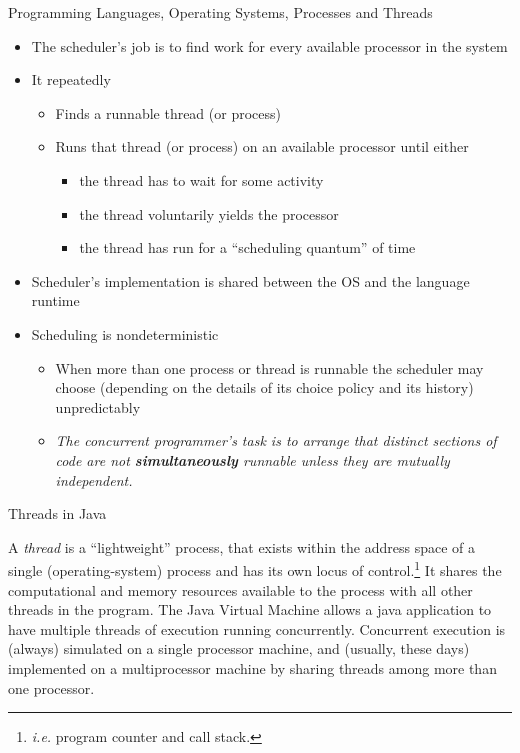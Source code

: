 \documentclass{concdistfoils}
\def\heading#1{\begin{cframed}[8.8in]{#1}\end{cframed}}
\begin{document}
\begin{section}{Programming Languages, Operating Systems, Processes and Threads}
\begin{slide}
\begin{itemize}
\item The scheduler's job is to find work for every available processor in the system
\vfill
\item It repeatedly
\begin{itemize}
\item Finds a runnable thread (or process)
\item Runs that thread (or process) on an available processor until either
\begin{itemize}
        \item the thread has to wait for some activity 
        \item the thread voluntarily yields the processor
        \item the thread has run for a ``scheduling quantum'' of time
\end{itemize}
\end{itemize}
\vfill
\item Scheduler's implementation is shared between the OS and the language runtime
\vfill
\item Scheduling is nondeterministic
\begin{itemize}
\item When more than one process or thread is runnable the scheduler may choose 
(depending on the details of its choice policy and its history) unpredictably 
\vfill
\item \textit{The concurrent programmer's task is to arrange that distinct sections of code 
are not \textbf{simultaneously} runnable unless they are mutually independent.}
\end{itemize}
\end{itemize}
\end{slide}

\begin{slide}
\heading{Threads in Java}
\begin{note}
A \textit{thread} is a ``lightweight'' process, that exists within
the address space of a single (operating-system) process and has its
own locus of control.\footnote{\textit{i.e.} program counter and call
stack.} It shares the computational and memory resources available to
the  process with all other threads  in the program. The Java Virtual
Machine allows a java application to have multiple threads of execution
running concurrently. Concurrent execution is (always) simulated on a
single processor machine, and (usually, these days) implemented on a
multiprocessor machine by sharing threads among more than one processor.


\end{note}
\end{slide}
\end{section}
\end{document}
